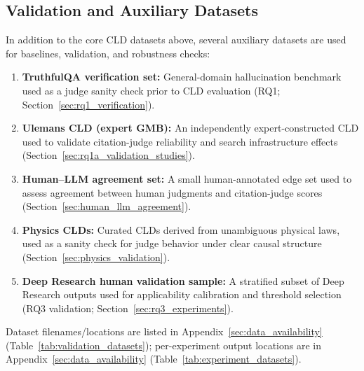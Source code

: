 \subsection{Validation and Auxiliary Datasets}
\label{sec:aux_datasets}

In addition to the core CLD datasets above, several auxiliary datasets are used for baselines, validation, and robustness checks:
\begin{enumerate}[noitemsep]
    \item \textbf{TruthfulQA verification set:} General-domain hallucination benchmark used as a judge sanity check prior to CLD evaluation (RQ1; Section~\ref{sec:rq1_verification}).
    \item \textbf{Ulemans CLD (expert GMB):} An independently expert-constructed CLD used to validate citation-judge reliability and search infrastructure effects (Section~\ref{sec:rq1a_validation_studies}).
    \item \textbf{Human--LLM agreement set:} A small human-annotated edge set used to assess agreement between human judgments and citation-judge scores (Section~\ref{sec:human_llm_agreement}).
    \item \textbf{Physics CLDs:} Curated CLDs derived from unambiguous physical laws, used as a sanity check for judge behavior under clear causal structure (Section~\ref{sec:physics_validation}).
    \item \textbf{Deep Research human validation sample:} A stratified subset of Deep Research outputs used for applicability calibration and threshold selection (RQ3 validation; Section~\ref{sec:rq3_experiments}).
\end{enumerate}
Dataset filenames/locations are listed in Appendix~\ref{sec:data_availability} (Table~\ref{tab:validation_datasets}); per-experiment output locations are in Appendix~\ref{sec:data_availability} (Table~\ref{tab:experiment_datasets}).

